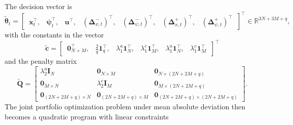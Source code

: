 The decision vector is
\begin{equation*}
    \tilde{\bm{\theta}}_t = \begin{bmatrix}\, \bm{x}_t^\top,& \bm{\psi}_t^\top,& \bm{u}^\top,&
    (\bm{\Delta}_{x,t}^-)^\top,& (\bm{\Delta}_{\psi,t}^-)^\top,&
    (\bm{\Delta}_{x,t}^+)^\top,& (\bm{\Delta}_{\psi,t}^+)^\top \,\end{bmatrix}^\top
    \in \mathbb{R}^{3N+3M+q},
\end{equation*}
with the constants in the vector
\begin{equation*}
    \tilde{\bm{c}} = \begin{bmatrix}\, \bm{0}_{N+M}^\top,& \tfrac{2}{q} \bm{1}_q^\top,&
    \lambda_1^a \bm{1}_N^\top,& \lambda_1^c \bm{1}_M^\top,&
    \lambda_1^a \bm{1}_N^\top,& \lambda_1^c \bm{1}_M^\top \,\end{bmatrix}^\top
\end{equation*}
and the penalty matrix
\begin{equation*}
    \tilde{\bm{Q}} =
    \begin{bmatrix}
        \lambda_2^a \bm{I}_N & \bm{0}_{N \times M} & \bm{0}_{N\times(2N + 2M + q)} \\
        \bm{0}_{M \times N} & \lambda_2^c \bm{I}_M & \bm{0}_{M\times(2N + 2M + q)} \\
        \bm{0}_{(2N+2M+q) \times N} & \bm{0}_{(2N+2M+q) \times M} & \bm{0}_{(2N+2M+q) \times (2N+2M+q)}
    \end{bmatrix}.
\end{equation*}
The joint portfolio optimization problem under mean absolute deviation then becomes a quadratic program with linear
constraints
